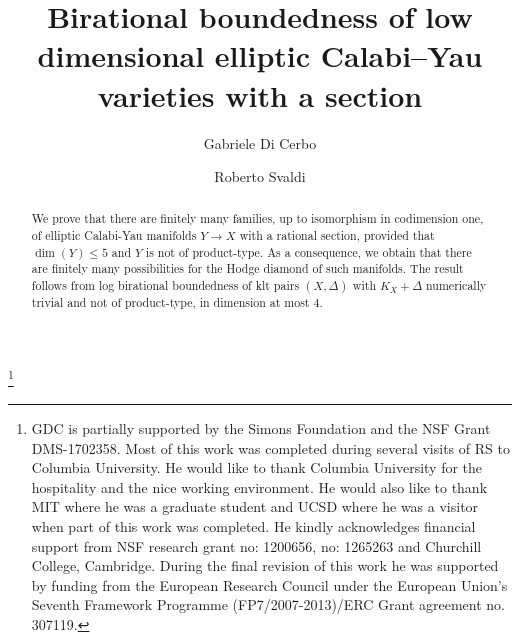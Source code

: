 \documentclass{amsart}[12pt,a4paper]
\theoremstyle{definition}
\begin{document}

\author{Gabriele Di Cerbo}
\address{Department of Mathematics, Princeton University, Princeton, NJ 08540, USA} 


\author{Roberto Svaldi}
\address{EPFL, SB MATH-GE, MA B1 497 (B\^{a}timent MA), Station 8, CH-1015 Lausanne, Switzerland.}



\title[Birational boundedness of elliptic Calabi--Yau varieties]{Birational boundedness of low dimensional elliptic Calabi--Yau varieties with a section}







\thanks{
GDC is partially supported by the Simons Foundation and the NSF Grant DMS-1702358.
Most of this work was completed during several visits of RS to Columbia University. 
He would like to thank Columbia University for the hospitality and the nice working environment. 
He would also like to thank MIT where he was a graduate student 
and UCSD where he was a visitor when part of this work was completed. 
He kindly acknowledges financial support from NSF research grant no: 1200656, no: 1265263 and Churchill College, Cambridge. 
During the final revision of this work he was supported by 
funding from the European Research Council under the European Union's Seventh Framework Programme (FP7/2007-2013)/ERC Grant agreement no. 307119.
}


\begin{abstract}
We prove that there are finitely many families, up to isomorphism in codimension one, 
of elliptic Calabi-Yau manifolds $Y\rightarrow X$ with a rational section, provided that $\dim(Y)\leq 5$ and $Y$ is not of product-type. 
As a consequence, we obtain that there are finitely many possibilities for the Hodge diamond of such manifolds. 
The result follows from log birational boundedness of klt pairs $(X, \Delta)$ with $K_X+\Delta$ numerically trivial
and not of product-type, in dimension at most $4$.
\end{abstract}
\end{document}
